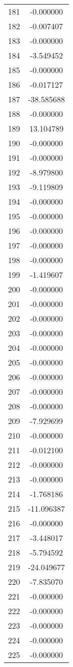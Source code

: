 \documentclass[12pt]{article}
\begin{document}
\begin{longtable}{@{}cc@{}}
181 & -0.000000 \\
182 & -0.007407 \\
183 & -0.000000 \\
184 & -3.549452 \\
185 & -0.000000 \\
186 & -0.017127 \\
187 & -38.585688 \\
188 & -0.000000 \\
189 & 13.104789 \\
190 & -0.000000 \\
191 & -0.000000 \\
192 & -8.979800 \\
193 & -9.119809 \\
194 & -0.000000 \\
195 & -0.000000 \\
196 & -0.000000 \\
197 & -0.000000 \\
198 & -0.000000 \\
199 & -1.419607 \\
200 & -0.000000 \\
201 & -0.000000 \\
202 & -0.000000 \\
203 & -0.000000 \\
204 & -0.000000 \\
205 & -0.000000 \\
206 & -0.000000 \\
207 & -0.000000 \\
208 & -0.000000 \\
209 & -7.929699 \\
210 & -0.000000 \\
211 & -0.012100 \\
212 & -0.000000 \\
213 & -0.000000 \\
214 & -1.768186 \\
215 & -11.096387 \\
216 & -0.000000 \\
217 & -3.448017 \\
218 & -5.794592 \\
219 & -24.049677 \\
220 & -7.835070 \\
221 & -0.000000 \\
222 & -0.000000 \\
223 & -0.000000 \\
224 & -0.000000 \\
225 & -0.000000 \\

\end{longtable}
\end{document}
